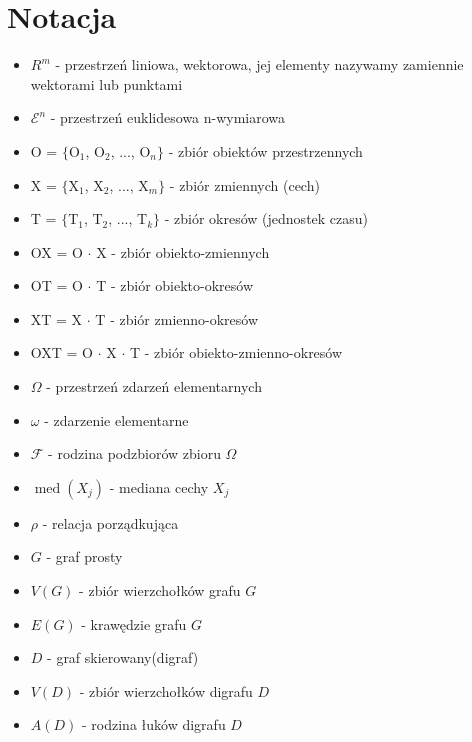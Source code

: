 \documentclass[12pt,a4paper]{report}
\newcommand{\mediana}{\operatorname{med}}
\begin{document}
\section{Notacja}   
\begin{itemize}
\item $R^m$ - przestrzeń liniowa, wektorowa, jej elementy nazywamy zamiennie wektorami lub punktami
\item $\mathcal{E}^n$ - przestrzeń euklidesowa n-wymiarowa
\item O = $\{$O$_{1}$, O$_{2}$, ..., O$_{n}\}$ - zbiór obiektów przestrzennych
\item X = $\{$X$_{1}$, X$_{2}$, ..., X$_{m}\}$ - zbiór zmiennych (cech)
\item T = $\{$T$_{1}$, T$_{2}$, ..., T$_{k}\}$ - zbiór okresów (jednostek czasu)
\item OX = O $\cdot$ X - zbiór obiekto-zmiennych 
\item OT = O $\cdot$ T - zbiór obiekto-okresów
\item XT = X $\cdot$ T - zbiór zmienno-okresów
\item OXT = O $\cdot$ X $\cdot$ T - zbiór obiekto-zmienno-okresów
\item $\Omega$ - przestrzeń zdarzeń elementarnych
\item $\omega$ - zdarzenie elementarne 
\item $\mathcal{F}$ - rodzina podzbiorów zbioru $\Omega$
\item $\mediana (X_{j})$ - mediana cechy $X_{j}$
\item $\rho$ - relacja porządkująca
\item $G$ - graf prosty
\item $V(G)$ - zbiór wierzchołków grafu $G$
\item $E(G)$ - krawędzie grafu $G$
\item $D$ - graf skierowany(digraf)
\item $V(D)$ - zbiór wierzchołków digrafu $D$
\item $A(D)$ - rodzina łuków digrafu $D$


\end{itemize}
\newpage
\end{document}
